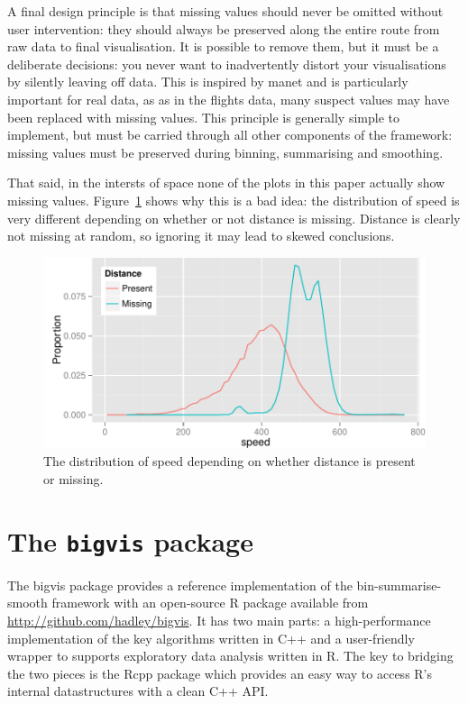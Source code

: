 \documentclass[journal]{vgtc}                %
\begin{document}
A final design principle is that missing values should never be omitted without user intervention: they should always be preserved along the entire route from raw data to final visualisation. It is possible to remove them, but it must be a deliberate decisions: you never want to inadvertently distort your visualisations by silently leaving off data. This is inspired by {\sc manet} \citep{unwin:1996} and is particularly important for real data, as as in the flights data, many suspect values may have been replaced with missing values. This principle is generally simple to implement, but must be carried through all other components of the framework: missing values must be preserved during binning, summarising and smoothing.

That said, in the intersts of space none of the plots in this paper actually show missing values. Figure~\ref{fig:missing} shows why this is a bad idea: the distribution of speed is very different depending on whether or not distance is missing. Distance is clearly not missing at random, so ignoring it may lead to skewed conclusions.

\begin{figure}
  \centering
   \includegraphics[width=\linewidth]{speed-distance}
 \caption{The distribution of speed depending on whether distance is present or missing.}
 \label{fig:missing}
\end{figure}

\section{The {\tt bigvis} package}
\label{sec:bigvis}

The bigvis package provides a reference implementation of the bin-summarise-smooth framework with an open-source R package available from \url{http://github.com/hadley/bigvis}. It has two main parts: a high-performance implementation of the key algorithms written in C++ and a user-friendly wrapper to supports exploratory data analysis written in R. The key to bridging the two pieces is the Rcpp package \citep{eddelbuettel:2011} which provides an easy way to access R's internal datastructures with a clean C++ API. 
\end{document}
